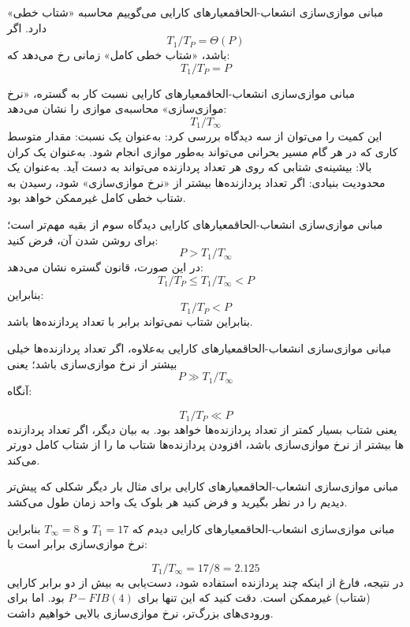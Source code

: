 \begin{itemframe-s}{مبانی موازی‌سازی انشعاب-الحاق}{معیارهای کارایی}
\itm
می‌گوییم محاسبه «شتاب خطی»
دارد. اگر
$$T_1 / T_P = \Theta(P)$$
باشد،
«شتاب خطی کامل»
زمانی رخ می‌دهد که:
$$T_1 / T_P = P$$
\end{itemframe-s}


\begin{itemframe-s}{مبانی موازی‌سازی انشعاب-الحاق}{معیارهای کارایی}
\itm
نسبت کار به گستره، «نرخ موازی‌سازی»
محاسبه‌ی موازی را نشان می‌دهد:
$$T_1 / T_∞$$
این کمیت را می‌توان از سه دیدگاه بررسی کرد:
\itm[1]
به‌عنوان یک نسبت: مقدار متوسط کاری که در هر گام مسیر بحرانی می‌تواند به‌طور موازی انجام شود.
\itm[2]
به‌عنوان یک کران بالا: بیشینه‌ی شتابی که روی هر تعداد پردازنده می‌تواند به دست آید.
\itm[3]
به‌عنوان یک محدودیت بنیادی: اگر تعداد پردازنده‌ها بیشتر از «نرخ موازی‌سازی» شود، رسیدن به شتاب خطی کامل غیرممکن خواهد بود.
\end{itemframe-s}


\begin{itemframe-s}{مبانی موازی‌سازی انشعاب-الحاق}{معیارهای کارایی}
\itm
دیدگاه سوم از بقیه مهم‌تر است؛ برای روشن شدن آن، فرض کنید:
$$P > T_1 / T_∞$$
در این صورت، قانون گستره نشان می‌دهد:
$$T_1 / T_P ≤ T_1 / T_∞ < P$$
بنابراین:
$$T_1 / T_P < P$$
بنابراین شتاب نمی‌تواند برابر با تعداد پردازنده‌ها باشد.
\end{itemframe-s}



\begin{itemframe-s}{مبانی موازی‌سازی انشعاب-الحاق}{معیارهای کارایی}
\itm
به‌علاوه، اگر تعداد پردازنده‌ها خیلی بیشتر از نرخ موازی‌سازی باشد؛ یعنی
$$P ≫ T_1 / T_∞$$
آنگاه:

$$T_1 / T_P ≪ P$$
یعنی شتاب بسیار کمتر از تعداد پردازنده‌ها خواهد بود.
\itm
به بیان دیگر، اگر تعداد پردازنده ها بیشتر از نرخ موازی‌سازی باشد،
افزودن پردازنده‌ها شتاب ما را از شتاب کامل دورتر می‌کند.
\end{itemframe-s}


\begin{itemframe-s}{مبانی موازی‌سازی انشعاب-الحاق}{معیارهای کارایی}
\itm
برای مثال بار دیگر شکلی که پیش‌تر دیدیم را در نظر بگیرید و فرض کنید هر بلوک یک واحد زمان طول می‌کشد.
\end{itemframe-s}


\begin{itemframe-s}{مبانی موازی‌سازی انشعاب-الحاق}{معیارهای کارایی}
\itm
دیدم که
$T_1 = 17 $
و
$ T_∞ = 8 $
بنابراین نرخ موازی‌سازی برابر است با:

$$T_1 / T_∞ = 17 / 8 = 2.125$$
\itm
در نتیجه، فارغ از اینکه چند پردازنده استفاده شود، دست‌یابی به بیش از دو برابر کارایی (شتاب) غیرممکن است.
\itm
دقت کنید که این تنها برای
$P-FIB(4)$
بود. اما برای ورودی‌های بزرگ‌تر،
نرخ موازی‌سازی بالایی خواهیم داشت.
\end{itemframe-s}


